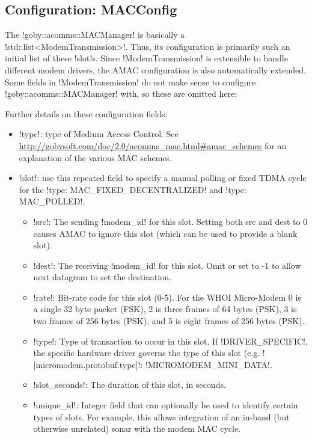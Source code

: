 \subsection{Configuration: MACConfig}

The !goby::acomms::MACManager! is basically a !std::list<ModemTransmission>!. Thus, its configuration is primarily such an initial list of these !slot!s. Since !ModemTransmission! is extensible to handle different modem drivers, the AMAC configuration is also automatically extended. Some fields in !ModemTransmission! do not make sense to configure !goby::acomms::MACManager! with, so these are omitted here:

\resetbvlinenumber


Further details on these configuration fields: 
\begin{itemize}
\item !type!: type of Medium Access Control. See \url{http://gobysoft.com/doc/2.0/acomms_mac.html#amac_schemes} for an explanation of the various MAC schemes.
\item !slot!: use this repeated field to specify a manual polling or fixed TDMA cycle for the  !type: MAC_FIXED_DECENTRALIZED! and  !type: MAC_POLLED!. 
\begin{itemize}
\item !src!: The sending !modem_id! for this slot. Setting both src and dest to 0 causes AMAC to ignore this slot (which can be used to provide a blank slot).
\item !dest!: The receiving !modem_id! for this slot. Omit or set to -1 to allow next datagram to set the destination.
\item !rate!: Bit-rate code for this slot (0-5). For the WHOI Micro-Modem 0 is a single 32 byte packet (FSK), 2 is three frames of 64 bytes (PSK), 3 is two frames of 256 bytes (PSK), and 5 is eight frames of 256 bytes (PSK).
\item !type!: Type of transaction to occur in this slot. If !DRIVER_SPECIFIC!, the specific hardware driver governs the type of this slot (e.g. ![micromodem.protobuf.type]!: !MICROMODEM_MINI_DATA!. 
\item !slot_seconds!: The duration of this slot, in seconds.
\item !unique_id!: Integer field that can optionally be used to identify certain types of slots. For example, this allows integration of an in-band (but otherwise unrelated) sonar with the modem MAC cycle.
\end{itemize} 
\end{itemize} 

